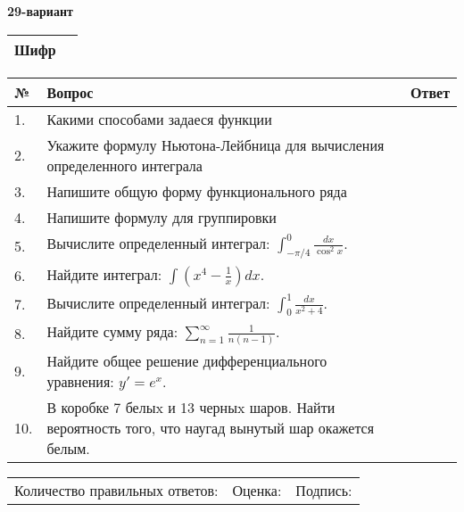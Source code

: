 \documentclass{article}
\begin{document}
  \egroup
  
  \newpage
  
  
  \textbf{29-вариант}\\
  
  \bgroup
  \def\arraystretch{1.6} %
  
  \begin{tabular}{|m{5.7cm}|m{9.5cm}|}
  \hline
  Шифр & \\
  \hline
  \end{tabular}
  
  \vspace{1cm}
  
  \begin{tabular}{|m{0.7cm}|m{10cm}|m{4cm}|}
  \hline
  № & Вопрос & Ответ \\
  \hline
  1. & Какими способами задаеся функции &  \\
  \hline
  2. & Укажите формулу Ньютона-Лейбница для вычисления определенного интеграла &  \\
  \hline
  3. & Напишите общую форму функционального ряда &  \\
  \hline
  4. & Напишите формулу для группировки &  \\
  \hline
  5. & Вычислите определенный интеграл: \(\int_{-\pi/4}^{0}\frac{dx}{\cos^2x}\). &  \\
  \hline
  6. & Найдите интеграл: \(\int\left( x^{4} - \frac{1}{x} \right)dx\). &  \\
  \hline
  7. & Вычислите определенный интеграл: \(\int_{0}^{1}\frac{dx}{x^{2} + 4}\). &  \\
  \hline
  8. & Найдите сумму ряда: \(\sum_{n = 1}^{\infty}\frac{1}{n(n - 1)}\). &  \\
  \hline
  9. & Найдите общее решение дифференциального уравнения: \(y' = e^{x}\). &  \\
  \hline
  10. & В коробке 7 белыx и 13 черныx шаров. Найти вероятность того, что наугад вынутый шар окажется белым. &  \\
  \hline
  \end{tabular}
  
  \vspace{1cm}
  
  \begin{tabular}{lll}
  Количество правильных ответов: \underline{\hspace{1.5cm}} & 
  Оценка: \underline{\hspace{1.5cm}} & 
  Подпись: \underline{\hspace{2cm}} \\
  \end{tabular}
  
\end{document}
